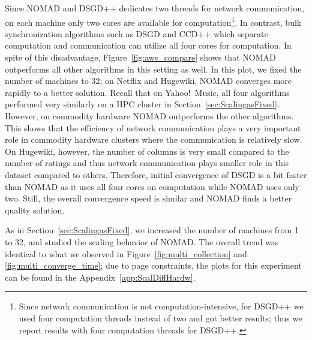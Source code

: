 \documentclass{vldb}
\begin{document}
Since NOMAD and DSGD++ dedicates two threads for network
communication, on each machine only two cores are available for
computation\footnote{Since network communication is not
  computation-intensive, for DSGD++ we used four computation threads
  instead of two and got better results; thus we report results with
  four computation threads for DSGD++. }. In contrast, bulk
synchronization algorithms such as DSGD and CCD++ which separate
computation and communication can utilize all four cores for
computation.
In spite of this disadvantage, Figure~\ref{fig:aws_compare} shows that
NOMAD outperforms all other algorithms in this setting as well.  In this
plot, we fixed the number of machines to 32; on Netflix and Hugewiki,
NOMAD converges more rapidly to a better solution.  Recall that on
Yahoo!~Music, all four algorithms performed very similarly on a HPC
cluster in Section~\ref{sec:ScalingasFixed}.  However, on commodity
hardware NOMAD outperforms the other algorithms.  This shows that the
efficiency of network communication plays a very important role in
commodity hardware clusters where the communication is relatively slow.
On Hugewiki, however, the number of columns is very small
compared to the number of ratings and thus network communication plays
smaller role in this dataset compared to others.  Therefore, initial
convergence of DSGD is a bit faster than NOMAD as it uses all four cores
on computation while NOMAD uses only two.  Still, the overall
convergence speed is similar and NOMAD finds a better quality solution.

As in Section~\ref{sec:ScalingasFixed}, we increased the number of
machines from 1 to 32, and studied the scaling behavior of NOMAD.  The
overall trend was identical to what we observed in
Figure~\ref{fig:multi_collection} and \ref{fig:multi_converge_time};
due to page constraints, the plots for this experiment can be found in
the Appendix~\ref{app:ScalDiffHardw}.
\end{document}
